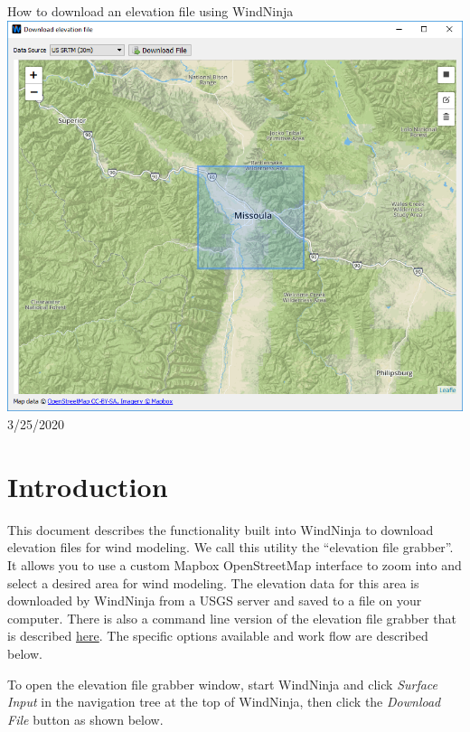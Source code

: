 \documentclass[12pt]{article}
\begin{document}
\begin{titlepage}
    \centering
    {\Huge
       How to download an elevation file using WindNinja
    }    
    \vfill
    \includegraphics[scale=0.75]{dem_download_0}
    \vfill
  	{\Huge
	  3/25/2020 %
  	}
    \vfill
\end{titlepage}


\section*{Introduction}
This document describes the functionality built into WindNinja to download
elevation files for wind modeling.  We call this utility the “elevation file
grabber”.  It allows you to use a custom \textcopyright Mapbox \textcopyright OpenStreetMap interface to zoom into
and select a desired area for wind modeling. The elevation data for this area
is downloaded by WindNinja from a USGS server and saved to a file on your
computer.  There is also a command line version of the elevation file grabber
that is described \href{http://firelab.github.io/windninja/pdf/fetch_dem_instructions.pdf}{here}.  The specific
options available and work flow are described below.

To open the elevation file grabber window, start WindNinja and click \textit{Surface Input} in the navigation tree at the top of WindNinja, then click the \textit{Download File} button as shown below.
\end{document}
